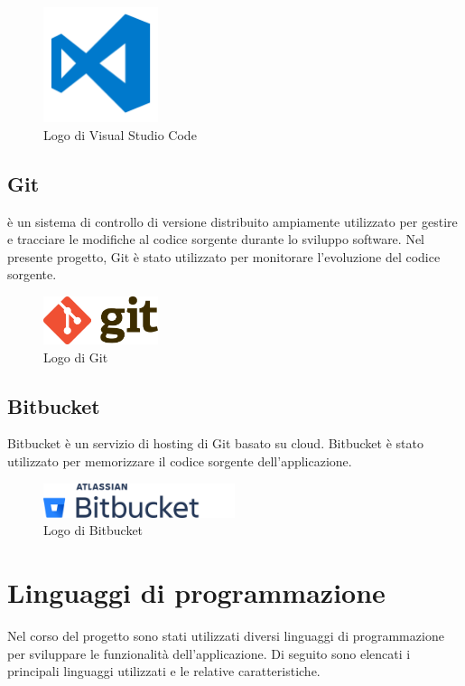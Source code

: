 \begin{figure}[h]
  \centering
  \includegraphics[width=0.3\textwidth]{img/tecnologie/vscode.png}
  \caption{Logo di Visual Studio Code}
  \label{fig:vscode}
\end{figure}

\subsection{Git}
 è un sistema di controllo di versione distribuito ampiamente utilizzato per gestire e tracciare le modifiche al codice sorgente durante lo sviluppo software. Nel presente progetto, Git è stato utilizzato per monitorare l'evoluzione del codice sorgente.


\begin{figure}[h]
  \centering
  \includegraphics[width=0.3\textwidth]{img/tecnologie/git.png}
  \caption{Logo di Git}
  \label{fig:git}
\end{figure}

\subsection{Bitbucket}
Bitbucket è un servizio di hosting di  Git basato su cloud. Bitbucket è stato utilizzato per memorizzare il codice sorgente dell'applicazione.

\begin{figure}[h]
  \centering
  \includegraphics[width=0.5\textwidth]{img/tecnologie/bitbucket.png}
  \caption{Logo di Bitbucket}
  \label{fig:bitbucket}
\end{figure}

\section{Linguaggi di programmazione}
Nel corso del progetto sono stati utilizzati diversi linguaggi di programmazione per sviluppare le funzionalità dell'applicazione. Di seguito sono elencati i principali linguaggi utilizzati e le relative caratteristiche.
